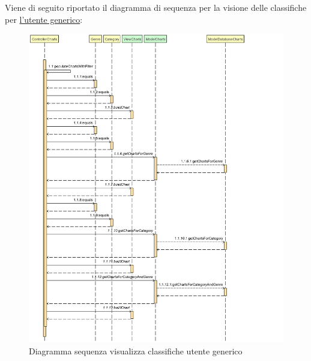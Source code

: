 \documentclass[a4paper,11pt]{report}
\begin{document}
\clearpage

Viene di seguito riportato il diagramma di sequenza per la visione delle classifiche per \underline{l'utente generico}:\\
\begin{figure}[h!]
    	\centering
    	\hspace*{-0.4in}
    	\includegraphics[width=1.1\linewidth]{Sequence diagrams/2 Order Creation/viewCharts.png}
    	\caption{Diagramma sequenza visualizza classifiche utente generico}
    \end{figure}\\
\clearpage
\end{document}
